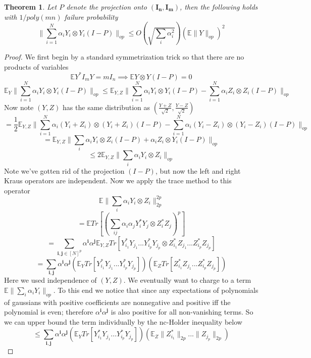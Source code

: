 \documentclass{article}
\newtheorem{theorem}{Theorem}
\renewcommand{\vec}{\bm}
\newcommand{\E}{\mathbb{E}}
\begin{document}
\begin{theorem}
Let $P$ denote the projection onto $(\vec{I_{n}},\vec{I_{m}})$, then the following holds with $1/poly(mn)$ failure probability
\[ \|\sum_{i=1}^{N} \alpha_{i} Y_{i} \otimes Y_{i} (I - P) \|_{op} \leq O \left( \sqrt{\sum_{i} \alpha_{i}^{2}} \right) \left( \E \|Y\|_{op} \right)^{2} \]
\end{theorem}
\begin{proof}
We first begin by a standard symmetrization trick so that there are no products of variables
\[\E Y^{*} I_{m} Y = m I_{n} \implies \E Y \otimes Y (I-P) = 0\]
\[ \E_{Y} \|\sum_{i=1}^{N} \alpha_{i} Y_{i} \otimes Y_{i} (I - P)\|_{op} \leq \E_{Y,Z} \|\sum_{i=1}^{N} \alpha_{i} Y_{i} \otimes Y_{i} (I - P) - \sum_{i=1}^{N} \alpha_{i} Z_{i} \otimes Z_{i} (I - P) \|_{op}  \]
Now note $(Y,Z)$ has the same distribution as $(\frac{Y+Z}{\sqrt{2}},\frac{Y-Z}{\sqrt{2}})$
\[ = \frac{1}{2}\E_{Y,Z} \|\sum_{i=1}^{N} \alpha_{i} (Y_{i}+Z_{i}) \otimes (Y_{i}+Z_{i}) (I - P) - \sum_{i=1}^{N} \alpha_{i} (Y_{i}-Z_{i}) \otimes (Y_{i}-Z_{i}) (I - P) \|_{op}  \]
\[ = \E_{Y,Z} \|\sum_{i} \alpha_{i} Y_{i} \otimes Z_{i} (I-P) + \alpha_{i} Z_{i} \otimes Y_{i} (I-P)\|_{op}  \]
\[ \leq 2 \E_{Y,Z} \|\sum_{i} \alpha_{i} Y_{i} \otimes Z_{i}\|_{op}   \]
Note we've gotten rid of the projection $(I-P)$, but now the left and right Kraus operators are independent. Now we apply the trace method to this operator
\[ \E \|\sum_{i} \alpha_{i} Y_{i} \otimes Z_{i}\|_{2p}^{2p} \]
\[ = \E Tr [ \left( \sum_{ij} \alpha_{i} \alpha_{j} Y_{i}^{*} Y_{j} \otimes Z_{i}^{*} Z_{j} \right)^{p} ]  \]
\[ = \sum_{\vec{i},\vec{j} \in [N]^{p}} \alpha^{\vec{i}} \alpha^{\vec{j}} \E_{Y,Z} Tr [ Y_{i_{1}}^{*} Y_{j_{1}} ... Y_{i_{p}}^{*} Y_{j_{p}} \otimes Z_{i_{1}}^{*} Z_{j_{1}} ... Z_{i_{p}}^{*} Z_{j_{p}}  ]   \]
\[ = \sum_{\vec{i},\vec{j}} \alpha^{\vec{i}} \alpha^{\vec{j}} (\E_{Y} Tr [ Y_{i_{1}}^{*} Y_{j_{1}} ... Y_{i_{p}}^{*} Y_{j_{p}} ] ) (\E_{Z} Tr [ Z_{i_{1}}^{*} Z_{j_{1}} ... Z_{i_{p}}^{*} Z_{j_{p}} ] )  \]
Here we used independence of $(Y,Z)$. We eventually want to charge to a term $\E \|\sum_{i} \alpha_{i} Y_{i}\|_{op}$. To this end we notice that since any expectations of polynomials of gaussians with positive coefficients are nonnegative and positive iff the polynomial is even; therefore $\alpha^{\vec{i}} \alpha^{\vec{j}}$ is also positive for all non-vanishing terms. So we can upper bound the term individually by the nc-Holder inequality below
\[ \leq  \sum_{\vec{i},\vec{j}} \alpha^{\vec{i}} \alpha^{\vec{j}} (\E_{Y} Tr [ Y_{i_{1}}^{*} Y_{j_{1}} ... Y_{i_{p}}^{*} Y_{j_{p}} ] ) ( \E_{Z} \|Z_{i_{1}}^{*}\|_{2p} ... \|Z_{j_{p}}\|_{2p} )  \]


\end{proof}
\end{document}
